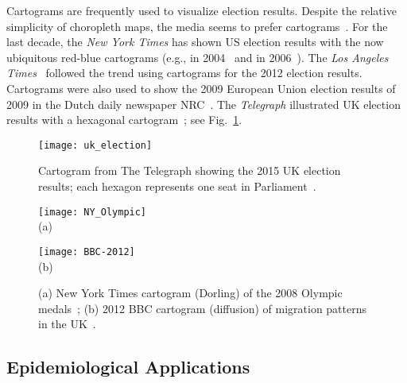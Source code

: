 \documentclass{egpubl}
\begin{document}
Cartograms are frequently used to visualize election results. Despite the relative simplicity of choropleth maps, the media seems to prefer cartograms~\cite{Dailykos_vir}. For the last decade, the \textit{New York Times} has shown US election results with the now ubiquitous red-blue cartograms (e.g., in 2004~\cite{NYT_04} and in 2006~\cite{NYT06}). The \textit{Los Angeles Times}~\cite{LAT12} followed the trend using cartograms for the 2012 election results. Cartograms were also used to show the 2009 European Union election results of 2009 in the Dutch daily newspaper NRC~\cite{NRC}. The \textit{Telegraph} illustrated UK election results with a hexagonal cartogram~\cite{UK15}; see Fig.~\ref{fig:uk_e}. 




\begin{figure}[htbp]
\begin{center}
\texttt{[image: uk\_election]}
\caption{Cartogram from The Telegraph showing the 2015 UK election results; each hexagon represents one seat in Parliament~\cite{UK15}.}
\label{fig:uk_e}
\end{center}
\end{figure} 


\begin{figure}[htbp]
\begin{center}
\texttt{[image: NY\_Olympic]}\\
(a)\\\vspace{.3cm}

\texttt{[image: BBC-2012]}\\
(b)

\caption{(a) New York Times cartogram (Dorling) of the 2008 Olympic medals~\cite{NYT_O}; 
(b) 2012 BBC cartogram (diffusion) of migration patterns in the UK~\cite{BBCmigration}.
}
\label{fig:4Cart}
\end{center}
\end{figure} 






\subsection{Epidemiological Applications}
\end{document}
